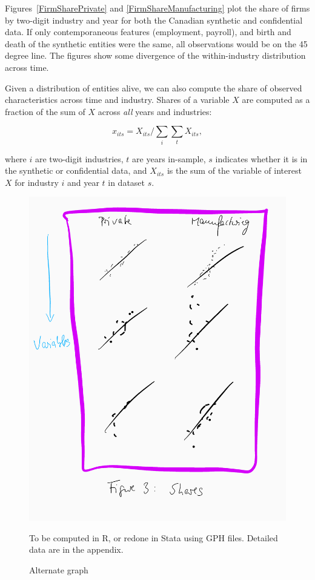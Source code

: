 Figures~\ref{FirmSharePrivate} and \ref{FirmShareManufacturing} plot the share of firms by two-digit industry and year for both the Canadian synthetic  and confidential data. If only contemporaneous features (employment, payroll), and birth and death of the synthetic entities were the same, all observations would be on the 45 degree line. The figures show some divergence of the within-industry distribution across time. 


Given a distribution of entities alive, we can also compute the share of observed characteristics across time and industry. Shares of a variable $X$ are computed as a fraction of the sum of $X$ across \textit{all} years and industries:

\begin{equation}
    \label{eq:share_employment}
x_{its} = X_{its}/\sum_{i} \sum_{t} X_{its}, 
\end{equation}

where $i$ are two-digit industries, $t$ are  years in-sample, $s$ indicates whether it is in the synthetic or confidential data, and $X_{its}$ is the sum of the variable of interest $X$ for industry $i$ and year $t$ in  dataset $s$.

\begin{figure} [H]
\centering
\label{tab:all:shares}
\includegraphics[width=.8\linewidth]{graphs/Figure3-placeholder.png} 
\caption{Alternate graph} 
\begin{minipage}{0.48\linewidth}
{\footnotesize To be computed in R, or redone in Stata using GPH files. Detailed data are in the appendix. \par}
\end{minipage}
\end{figure}


